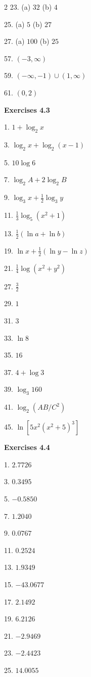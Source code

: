 \begin {multicols}{2}
23. (a) $32$ (b) $4$ 

25. (a) $5$ (b) $27$ 

27. (a) $100$ (b) $25$ 

57. $\left ( -3 ,\infty \right )$ 

59. $\left ( -\infty  , -1\right ) \cup \left (1 ,\infty \right )$ 

61. $\left (0 ,2\right )$ 

\textbf{Exercises 4.3} 

1.
$1 +\log _{2} x$ 

3. $\log _{2} x +\log _{2} \left (x -1\right )$ 

5. $10 \log  6$ 

7. $\log _{2} A +2 \log _{2} B$ 

9. $\log _{3} x +\frac{1}{2} \log _{3} y$ 

11. $\frac{1}{3} \log _{5} \left (x^{2} +1\right )$ 

13. $\frac{1}{2} \left (\ln  a +\ln  b\right )$ 

19. $\ln  x +\frac{1}{2} \left (\ln  y -\ln  z\right )$ 

21. $\frac{1}{4} \log  \left (x^{2} +y^{2}\right )$ 

27. $\frac{3}{2}$ 

29. $1$ 

31. $3$ 

33. $\ln  8$ 

35. $16$ 

37. $4 +\log  3$ 

39. $\log _{3} 160$ 

41. $\log _{2} \left (A B/C^{2}\right )$ 

45. $\ln  \left [5 x^{2} \left (x^{2} +5\right )^{3}\right ]$ 

\textbf{Exercises 4.4} 

1. $2.7726$ 

3. $0.3495$ 

5. $ -0.5850$ 

7. $1.2040$ 

9. $0.0767$ 

11. $0.2524$ 

13. $1.9349$ 

15. $ -43.0677$ 

17. $2.1492$ 

19. $6.2126$ 

21. $ -2.9469$ 

23. $ -2.4423$ 

25. $14.0055$ 


\end{multicols}
